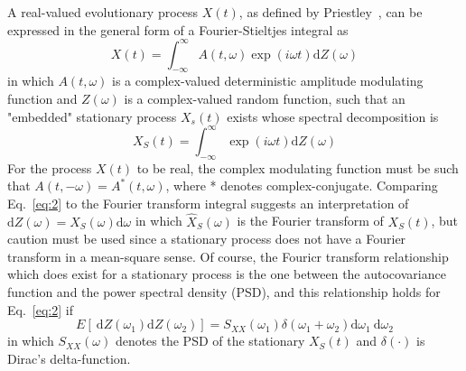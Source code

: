 \documentclass[12pt]{article}
\begin{document}
A real-valued evolutionary process $X(t)$, as defined by Priestley~\cite{Priestley1965}, can be expressed in the general form of a Fourier-Stieltjes integral as
\begin{equation}
X(t)=\int_{-\infty}^{\infty} A(t, \omega) \exp (i \omega t) \mathrm{d} Z(\omega)
\label{eq:1}
\end{equation}
in which $A(t, \omega)$ is a complex-valued deterministic amplitude modulating function and $Z(\omega)$ is a complex-valued random function, such that an "embedded" stationary process $X_{s}(t)$ exists whose spectral decomposition is
\begin{equation}
X_{S}(t)=\int_{-\infty}^{\infty} \exp (i \omega t) \mathrm{d} Z(\omega)
\label{eq:2}
\end{equation}
For the process $X(t)$ to be real, the complex modulating function must be such that $A(t,-\omega)=A^{*}(t, \omega)$, where * denotes complex-conjugate. Comparing Eq.~\eqref{eq:2} to the Fourier transform integral suggests an interpretation of $\mathrm{d} Z(\omega)=\hat{X}_{S}(\omega) \mathrm{d} \omega$ in which $\hat{X}_{S}(\omega)$ is the Fourier transform of $X_{S}(t)$, but caution must be used since a stationary process does not have a Fourier transform in a mean-square sense. Of course, the Fouricr transform relationship which does exist for a stationary process is the one between the autocovariance function and the power spectral density (PSD), and this relationship holds for Eq.~\eqref{eq:2} if
\begin{equation}
E\left[\mathrm{~d} Z\left(\omega_{1}\right) \mathrm{d} Z\left(\omega_{2}\right)\right]=S_{X X}\left(\omega_{1}\right) \delta\left(\omega_{1}+\omega_{2}\right) \mathrm{d} \omega_{1} \mathrm{~d} \omega_{2}
\label{eq:3}
\end{equation}
in which $S_{X X}(\omega)$ denotes the PSD of the stationary $X_{S}(t)$ and $\delta(\cdot)$ is Dirac's delta-function.
\end{document}
